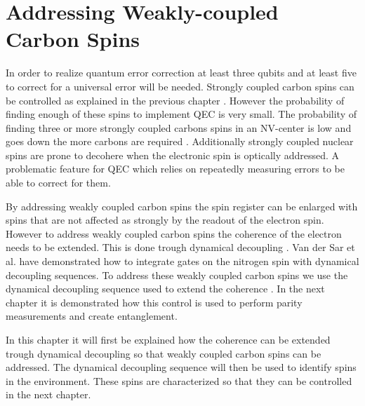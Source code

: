 
\chapter{Addressing Weakly-coupled Carbon Spins}
\label{chap:addressing_weakly_coupled_carbons}

In order to realize quantum error correction at least three qubits and at least five to correct for a universal error will be needed.
Strongly coupled carbon spins can be controlled as explained in the previous chapter \citep{Robledo2011HighFidelity,Waldherr2014Quantum}.
However the probability of finding enough of these spins to implement QEC is very small.
The probability of finding three or more strongly coupled carbons spins in an NV-center is low and goes down the more carbons are required \citep{Waldherr2014Quantum,Taminiau2014Universal}.
Additionally strongly coupled nuclear spins are prone to decohere when the electronic spin is optically addressed\citep{Pfaff2012Demonstration}.
A problematic feature for QEC which relies on repeatedly measuring errors to be able to correct for them.

By addressing weakly coupled carbon spins the spin register can be enlarged with spins that are not affected as strongly by the readout of the electron spin.
However to address weakly coupled carbon spins the coherence of the electron needs to be extended.
This is done trough dynamical decoupling \citep{Lange2010Universal}.
Van der Sar et al. \citep{Sar2012DecoherenceProtected} have demonstrated how to integrate gates on the nitrogen spin with dynamical decoupling sequences.
To address these weakly coupled carbon spins we use the dynamical decoupling sequence used to extend the coherence \citep{Taminiau2012Detection}.
In the next chapter it is demonstrated how this control is used to perform parity measurements and create entanglement.

In this chapter it will first be explained how the coherence can be extended trough dynamical decoupling so that weakly coupled carbon spins can be addressed.
The dynamical decoupling sequence will then be used to identify spins in the environment.
These spins are characterized so that they can be controlled in the next chapter.





